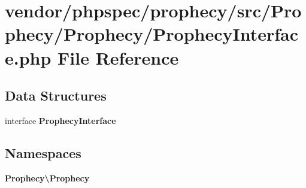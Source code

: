 \section{vendor/phpspec/prophecy/src/\+Prophecy/\+Prophecy/\+Prophecy\+Interface.php File Reference}
\label{_prophecy_interface_8php}
\subsection*{Data Structures}
\begin{DoxyCompactItemize}
\item 
interface {\bf Prophecy\+Interface}
\end{DoxyCompactItemize}
\subsection*{Namespaces}
\begin{DoxyCompactItemize}
\item 
 {\bf Prophecy\textbackslash{}\+Prophecy}
\end{DoxyCompactItemize}
